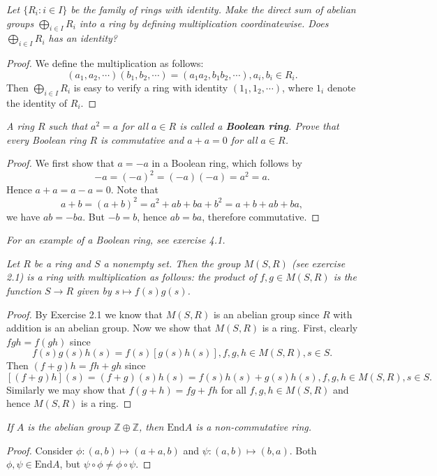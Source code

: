 \begin{problem}\em
Let $\{R_i:i\in I\}$ be the family of rings with identity. Make the direct sum of abelian groups $\bigoplus_{i\in I}R_i$ into a ring by defining multiplication coordinatewise. Does $\bigoplus_{i\in I}R_i$ has an identity?
\end{problem}
\begin{proof}
We define the multiplication as follows: 
$$(a_1,a_2,\cdots)(b_1,b_2,\cdots)=(a_1a_2,b_1b_2,\cdots),a_i,b_i\in R_i.$$
Then $\bigoplus_{i\in I}R_i$ is easy to verify a ring with identity $(1_1,1_2,\cdots)$, where $1_i$ denote the identity of $R_i$.
\end{proof}
\begin{problem}\em
A ring $R$ such that $a^2=a$ for all $a\in R$ is called a \textbf{Boolean ring}. Prove that every Boolean ring $R$ is commutative and $a+a=0$ for all $a\in R$.
\end{problem}
\begin{proof}
We first show that $a=-a$ in a Boolean ring, which follows by 
$$
-a=\left( -a \right) ^2=\left( -a \right) \left( -a \right) =a^2=a.
$$
Hence $a+a=a-a=0$. Note that 
$$
a+b=\left( a+b \right) ^2=a^2+ab+ba+b^2=a+b+ab+ba,
$$
we have $ab=-ba$. But $-b=b$, hence $ab=ba$, therefore commutative.
\end{proof}
\begin{note}\em
For an example of a Boolean ring, see exercise 4.1.
\end{note}
\begin{problem}\em
Let $R$ be a ring and $S$ a nonempty set. Then the group $M(S,R)$ (see exercise 2.1) is a ring with multiplication as follows: the product of $f,g\in M(S,R)$ is the function $S\to R$ given by $s\mapsto f(s)g(s)$.
\end{problem}
\begin{proof}
By Exercise 2.1 we know that $M(S,R)$ is an abelian group since $R$ with addition is an abelian group. Now we show that $M(S,R)$ is a ring. First, clearly $fgh=f(gh)$ since 
$$f(s)g(s)h(s)=f(s)[g(s)h(s)],f,g,h\in M(S,R),s\in S.$$
Then $(f+g)h=fh+gh$ since 
$$[(f+g)h](s)=(f+g)(s)h(s)=f(s)h(s)+g(s)h(s),f,g,h\in M(S,R),s\in S.$$
Similarly we may show that $f(g+h)=fg+fh$ for all $f,g,h\in M(S,R)$ and hence $M(S,R)$ is a ring.
\end{proof}
\begin{problem}\em
If $A$ is the abelian group $\mathbb{Z}\oplus\mathbb{Z}$, then $\mathrm{End}A$ is a non-commutative ring.
\end{problem}
\begin{proof}
Consider $\phi:(a,b)\mapsto (a+a,b)$ and $\psi:(a,b)\mapsto (b,a)$. Both $\phi,\psi\in\mathrm{End}A$, but $\psi\circ\phi\ne\phi\circ\psi$.
\end{proof}

